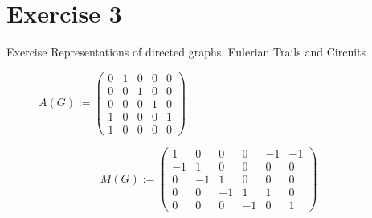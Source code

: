 
\section{Exercise 3}

\setcounter{exercise}{1}

\begin{frame}[allowframebreaks]{Exercise \thesection}{Representations of directed graphs, Eulerian Trails and Circuits}
    \begin{exercisenoinc}
        \begin{figure}[H]
    \centering
    $A(G) :=
    \begin{pmatrix}
      0 & 1 & 0 & 0 & 0 \\ %
      0 & 0 & 1 & 0 & 0 \\ %
      0 & 0 & 0 & 1 & 0 \\ %
      1 & 0 & 0 & 0 & 1 \\ %
      1 & 0 & 0 & 0 & 0 %
    \end{pmatrix}$
\end{figure}
    \end{exercisenoinc}
    \begin{solution}
    \end{solution}
    \begin{solution}
        \[ M(G) := 
        \begin{pmatrix}
1 & 0 & 0 & 0 & -1 & -1 \\
-1 & 1 & 0 & 0 & 0 & 0 \\
0 & -1 & 1 & 0 & 0 & 0 \\
0 & 0 & -1 & 1 & 1 & 0 \\
0 & 0 & 0 & -1 & 0 & 1
        \end{pmatrix}
        \]
    \end{solution}
    \begin{solution}
    \end{solution}
\end{frame}
